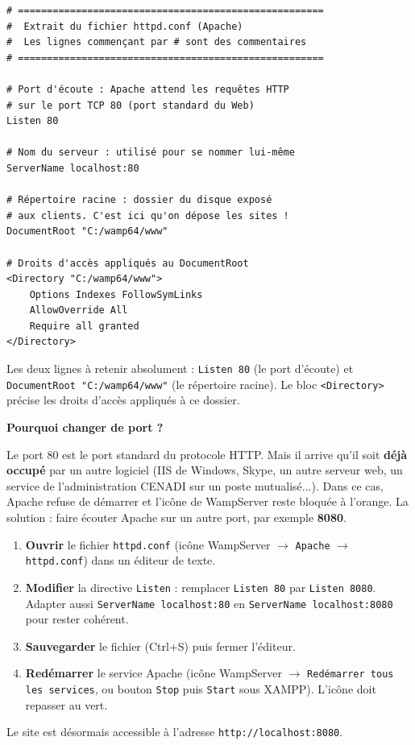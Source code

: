 \documentclass[11pt]{article}
\newcounter{popsec}
\newcounter{popsub}
\newcommand{\courssub}[1]{%
  \stepcounter{popsub}%
  \par\vspace{9pt}\noindent{\popxbold\fontsize{11.5}{13}\selectfont\color{popink}{\color{poporange}\thepopsec.\thepopsub}\hspace{6pt}#1}\par\nopagebreak\vspace{4pt}
}
\begin{document}
\begin{exemplebox}
\begin{lstlisting}
# =====================================================
#  Extrait du fichier httpd.conf (Apache)
#  Les lignes commençant par # sont des commentaires
# =====================================================

# Port d'écoute : Apache attend les requêtes HTTP
# sur le port TCP 80 (port standard du Web)
Listen 80

# Nom du serveur : utilisé pour se nommer lui-même
ServerName localhost:80

# Répertoire racine : dossier du disque exposé
# aux clients. C'est ici qu'on dépose les sites !
DocumentRoot "C:/wamp64/www"

# Droits d'accès appliqués au DocumentRoot
<Directory "C:/wamp64/www">
    Options Indexes FollowSymLinks
    AllowOverride All
    Require all granted
</Directory>
\end{lstlisting}
Les deux lignes à retenir absolument : \texttt{Listen 80} (le port d'écoute) et \texttt{DocumentRoot "C:/wamp64/www"} (le répertoire racine). Le bloc \texttt{<Directory>} précise les droits d'accès appliqués à ce dossier.
\end{exemplebox}

\courssub{Modifier le port d'écoute d'Apache}

\textbf{Pourquoi changer de port ?}\par
Le port 80 est le port standard du protocole HTTP. Mais il arrive qu'il soit \textbf{déjà occupé} par un autre logiciel (IIS de Windows, Skype, un autre serveur web, un service de l'administration CENADI sur un poste mutualisé...). Dans ce cas, Apache refuse de démarrer et l'icône de WampServer reste bloquée à l'orange. La solution : faire écouter Apache sur un autre port, par exemple \textbf{8080}.

\begin{methode}
\begin{enumerate}
  \item \textbf{Ouvrir} le fichier \texttt{httpd.conf} (icône WampServer $\rightarrow$ \texttt{Apache} $\rightarrow$ \texttt{httpd.conf}) dans un éditeur de texte.
  \item \textbf{Modifier} la directive \texttt{Listen} : remplacer \texttt{Listen 80} par \texttt{Listen 8080}. Adapter aussi \texttt{ServerName localhost:80} en \texttt{ServerName localhost:8080} pour rester cohérent.
  \item \textbf{Sauvegarder} le fichier (Ctrl+S) puis fermer l'éditeur.
  \item \textbf{Redémarrer} le service Apache (icône WampServer $\rightarrow$ \texttt{Redémarrer tous les services}, ou bouton \texttt{Stop} puis \texttt{Start} sous XAMPP). L'icône doit repasser au vert.
\end{enumerate}
Le site est désormais accessible à l'adresse \texttt{http://localhost:8080}.
\end{methode}
\end{document}
